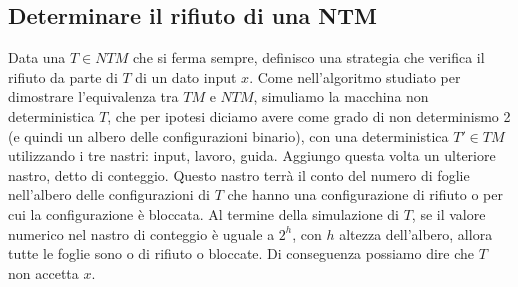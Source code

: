 \subsection{Determinare il rifiuto di una NTM}
Data una $T \in  NTM$ che si ferma sempre, definisco una strategia che verifica il rifiuto da parte di $T$ di un dato input $x$. 
Come nell'algoritmo studiato per dimostrare l'equivalenza tra $TM$ e $NTM$, simuliamo la macchina non deterministica $T$, che per ipotesi diciamo avere come grado di non determinismo 2 (e quindi un albero delle configurazioni binario), con una deterministica $T' \in TM$ utilizzando i tre nastri: input, lavoro, guida. Aggiungo questa volta un ulteriore nastro, detto di conteggio. Questo nastro terrà il conto del numero di foglie nell'albero delle configurazioni di $T$ che hanno una configurazione di rifiuto o per cui la configurazione è bloccata. Al termine della simulazione di $T$, se il valore numerico nel nastro di conteggio è uguale a $2^h$, con $h$ altezza dell'albero, allora tutte le foglie sono o di rifiuto o bloccate. Di conseguenza possiamo dire che $T$ non accetta $x$.